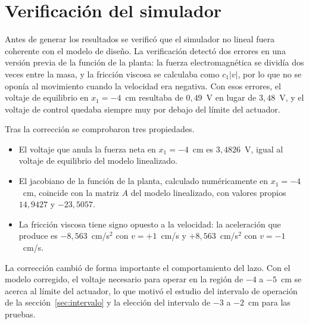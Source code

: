 \chapter{Verificación del simulador}\label{ap:verificacion}

Antes de generar los resultados se verificó que el simulador no lineal fuera coherente con el modelo de diseño. La verificación detectó dos errores en una versión previa de la función de la planta: la fuerza electromagnética se dividía dos veces entre la masa, y la fricción viscosa se calculaba como $c_1|v|$, por lo que no se oponía al movimiento cuando la velocidad era negativa. Con esos errores, el voltaje de equilibrio en $x_1=-4$~cm resultaba de $0{,}49$~V en lugar de $3{,}48$~V, y el voltaje de control quedaba siempre muy por debajo del límite del actuador.

Tras la corrección se comprobaron tres propiedades.

\begin{itemize}
  \item El voltaje que anula la fuerza neta en $x_1=-4$~cm es $3{,}4826$~V, igual al voltaje de equilibrio del modelo linealizado.
  \item El jacobiano de la función de la planta, calculado numéricamente en $x_1=-4$~cm, coincide con la matriz $A$ del modelo linealizado, con valores propios $14{,}9427$ y $-23{,}5057$.
  \item La fricción viscosa tiene signo opuesto a la velocidad: la aceleración que produce es $-8{,}563$~cm/s$^2$ con $v=+1$~cm/s y $+8{,}563$~cm/s$^2$ con $v=-1$~cm/s.
\end{itemize}

La corrección cambió de forma importante el comportamiento del lazo. Con el modelo corregido, el voltaje necesario para operar en la región de $-4$ a $-5$~cm se acerca al límite del actuador, lo que motivó el estudio del intervalo de operación de la sección~\ref{sec:intervalo} y la elección del intervalo de $-3$ a $-2$~cm para las pruebas.
